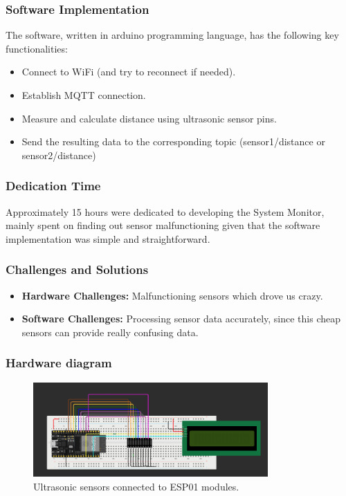 \subsubsection{Software Implementation}
The software, written in arduino programming language, has the following key functionalities:
\begin{itemize}
    \item Connect to WiFi (and try to reconnect if needed).
    \item Establish MQTT connection.
    \item Measure and calculate distance using ultrasonic sensor pins.
    \item Send the resulting data to the corresponding topic (sensor1/distance or sensor2/distance)
\end{itemize}

\subsubsection{Dedication Time}
Approximately 15 hours were dedicated to developing the System Monitor, mainly spent on finding out sensor malfunctioning given that the software implementation was simple and straightforward.

\subsubsection{Challenges and Solutions}
\begin{itemize}
    \item \textbf{Hardware Challenges:} Malfunctioning sensors which drove us crazy.
    \item \textbf{Software Challenges:} Processing sensor data accurately, since this cheap sensors can provide really confusing data.
\end{itemize}

\subsubsection{Hardware diagram}
\begin{figure}[ht]
    \centering
    \includegraphics[width=0.8\textwidth]{../images/activity_monitor_scheme.png}
    \caption{Ultrasonic sensors connected to ESP01 modules.}
    \label{fig:esp32_system_monitor}
\end{figure}

